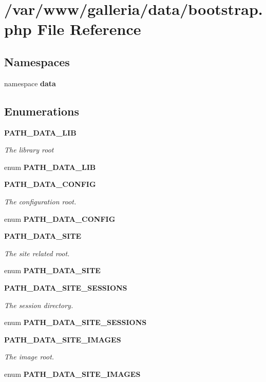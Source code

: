 \section{/var/www/galleria/data/bootstrap.php File Reference}
\label{bootstrap_8php}
\subsection*{Namespaces}
\begin{CompactItemize}
\item 
namespace {\bf data}
\end{CompactItemize}
\subsection*{Enumerations}
\begin{Indent}{\bf PATH\_\-DATA\_\-LIB}\par
{\em The library root }\begin{CompactItemize}
\item 
enum {\bf PATH\_\-DATA\_\-LIB} 
\end{CompactItemize}
\end{Indent}
\begin{Indent}{\bf PATH\_\-DATA\_\-CONFIG}\par
{\em The configuration root. }\begin{CompactItemize}
\item 
enum {\bf PATH\_\-DATA\_\-CONFIG} 
\end{CompactItemize}
\end{Indent}
\begin{Indent}{\bf PATH\_\-DATA\_\-SITE}\par
{\em The site related root. }\begin{CompactItemize}
\item 
enum {\bf PATH\_\-DATA\_\-SITE} 
\end{CompactItemize}
\end{Indent}
\begin{Indent}{\bf PATH\_\-DATA\_\-SITE\_\-SESSIONS}\par
{\em The session directory. }\begin{CompactItemize}
\item 
enum {\bf PATH\_\-DATA\_\-SITE\_\-SESSIONS} 
\end{CompactItemize}
\end{Indent}
\begin{Indent}{\bf PATH\_\-DATA\_\-SITE\_\-IMAGES}\par
{\em The image root. }\begin{CompactItemize}
\item 
enum {\bf PATH\_\-DATA\_\-SITE\_\-IMAGES} 
\end{CompactItemize}
\end{Indent}
